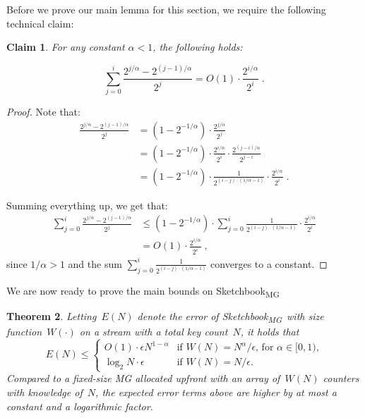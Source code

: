 \documentclass[sigconf]{acmart}
\newtheorem{theorem}{Theorem}[section]
\newtheorem{claim}[theorem]{Claim}
\newcommand{\sketch}{Sketchbook}
\newcommand{\sketchmg}{\sketch\textsubscript{MG}\xspace}
\begin{document}
Before we prove our main lemma for this section, we require the following technical claim:

\begin{claim}\label{claim:technical} For any constant $\alpha<1$, the following holds:

$$ \sum_{j=0}^i \frac{2^{j/\alpha} - 2^{(j-1)/\alpha}}{2^{j}} = O(1) \cdot \frac{2^{i/\alpha}}{2^i}\;.$$
\end{claim}
\begin{proof} Note that:
\begin{align*}
	\frac{2^{j/\alpha} - 2^{(j-1)/\alpha} } {2^j} &= (1-2^{-1/\alpha}) \cdot \frac{2^{j/\alpha} } {2^j } \\
	&= (1-2^{-1/\alpha}) \cdot  \frac{2^{i/\alpha}}{2^i } \cdot \frac{2^{(j-i)/\alpha}}{2^{j-i}}\\
	&=  (1-2^{-1/\alpha}) \cdot \frac{1}{2^{(i-j)\cdot (1/\alpha-1)}} \cdot \frac{2^{i/\alpha}}{2^i }  \;.
\end{align*}

Summing everything up, we get that:
\begin{align*}
	\sum_{j=0}^i  	 \frac{2^{j/\alpha} - 2^{(j-1)/\alpha} } {2^j} &\leq (1-2^{-1/\alpha}) \cdot  \sum_{j=0}^i \frac{1}{2^{(i-j)\cdot (1/\alpha-1)}} \cdot \frac{2^{i/\alpha}}{2^i }\\
	&= O(1) \cdot \frac{2^{i/\alpha}}{2^i }\;,
\end{align*}
since $1/\alpha >1$ and the sum $\sum_{j=0}^i \frac{1}{2^{(i-j)\cdot (1/\alpha-1)}}$ converges to a constant.
\end{proof}

\noindent
We are now ready to prove the main bounds on \sketchmg\:
\begin{theorem}
\label{thm:mg-normal}
Letting~$E(N)$ denote the error of \sketchmg\ with size function~$W(\cdot)$ on a stream with a total key count~$N$, it holds that
$$
E(N) \leq  
\begin{cases}
	O(1) \cdot \epsilon N^{1-\alpha} & \text{if $W(N)=N^{\alpha}/\epsilon$, for $\alpha \in [0,1)$,} \\
	\log_2 N \cdot \epsilon & \text{if $W(N)=N/\epsilon$.}
\end{cases}
$$
Compared to a fixed-size MG allocated upfront with an array of~$W(N)$
counters with knowledge of~$N$, the expected error terms above are higher
by at most a constant and a logarithmic factor.
\end{theorem}
\end{document}
